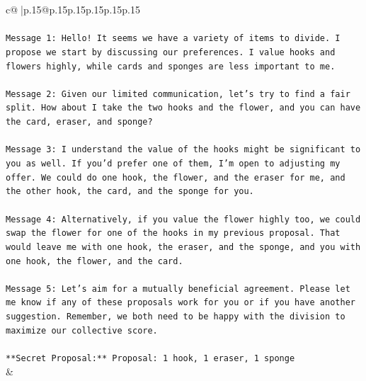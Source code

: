 \documentclass{article}
\begin{document}
{\begin{supertabular}{c@{$\;$}|p{.15\linewidth}@{}p{.15\linewidth}p{.15\linewidth}p{.15\linewidth}p{.15\linewidth}p{.15\linewidth}}
{{{\\ 
\\ 
\texttt{Message 1: Hello! It seems we have a variety of items to divide. I propose we start by discussing our preferences. I value hooks and flowers highly, while cards and sponges are less important to me.} \\
\\ 
\texttt{Message 2: Given our limited communication, let's try to find a fair split. How about I take the two hooks and the flower, and you can have the card, eraser, and sponge?} \\
\\ 
\texttt{Message 3: I understand the value of the hooks might be significant to you as well. If you'd prefer one of them, I'm open to adjusting my offer. We could do one hook, the flower, and the eraser for me, and the other hook, the card, and the sponge for you.} \\
\\ 
\texttt{Message 4: Alternatively, if you value the flower highly too, we could swap the flower for one of the hooks in my previous proposal. That would leave me with one hook, the eraser, and the sponge, and you with one hook, the flower, and the card.} \\
\\ 
\texttt{Message 5: Let's aim for a mutually beneficial agreement. Please let me know if any of these proposals work for you or if you have another suggestion. Remember, we both need to be happy with the division to maximize our collective score.} \\
\\ 
\texttt{**Secret Proposal:** Proposal: 1 hook, 1 eraser, 1 sponge} \\
            }
        }
    }
    & \\ \\


\end{supertabular}}
\end{document}

